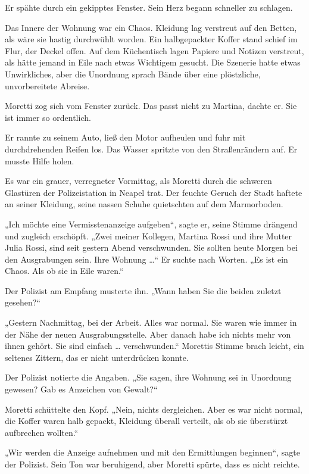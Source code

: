 \documentclass[
]{article}
\begin{document}
Er spähte durch ein gekipptes Fenster. Sein Herz begann schneller zu schlagen.

Das Innere der Wohnung war ein Chaos. Kleidung lag verstreut auf den Betten, als wäre sie hastig durchwühlt worden. Ein halbgepackter Koffer stand schief im Flur, der Deckel offen. Auf dem Küchentisch lagen Papiere und Notizen verstreut, als hätte jemand in Eile nach etwas Wichtigem gesucht. Die Szenerie hatte etwas Unwirkliches, aber die Unordnung sprach Bände über eine plöstzliche, unvorbereitete Abreise.

Moretti zog sich vom Fenster zurück. Das passt nicht zu Martina, dachte er. Sie ist immer so ordentlich.

Er rannte zu seinem Auto, ließ den Motor aufheulen und fuhr mit durchdrehenden Reifen los. Das Wasser spritzte von den Straßenrändern auf. Er musste Hilfe holen.

Es war ein grauer, verregneter Vormittag, als Moretti durch die schweren Glastüren der Polizeistation in Neapel trat. Der feuchte Geruch der Stadt haftete an seiner Kleidung, seine nassen Schuhe quietschten auf dem Marmorboden.

„Ich möchte eine Vermisstenanzeige aufgeben``, sagte er, seine Stimme drängend und zugleich erschöpft. „Zwei meiner Kollegen, Martina Rossi und ihre Mutter Julia Rossi, sind seit gestern Abend verschwunden. Sie sollten heute Morgen bei den Ausgrabungen sein. Ihre Wohnung \ldots`` Er suchte nach Worten. „Es ist ein Chaos. Als ob sie in Eile waren.``

Der Polizist am Empfang musterte ihn. „Wann haben Sie die beiden zuletzt gesehen?{\kern0pt}``

„Gestern Nachmittag, bei der Arbeit. Alles war normal. Sie waren wie immer in der Nähe der neuen Ausgrabungsstelle. Aber danach habe ich nichts mehr von ihnen gehört. Sie sind einfach \ldots{} verschwunden.`` Morettis Stimme brach leicht, ein seltenes Zittern, das er nicht unterdrücken konnte.

Der Polizist notierte die Angaben. „Sie sagen, ihre Wohnung sei in Unordnung gewesen? Gab es Anzeichen von Gewalt?{\kern0pt}``

Moretti schüttelte den Kopf. „Nein, nichts dergleichen. Aber es war nicht normal, die Koffer waren halb gepackt, Kleidung überall verteilt, als ob sie überstürzt aufbrechen wollten.``

„Wir werden die Anzeige aufnehmen und mit den Ermittlungen beginnen``, sagte der Polizist. Sein Ton war beruhigend, aber Moretti spürte, dass es nicht reichte.
\end{document}
